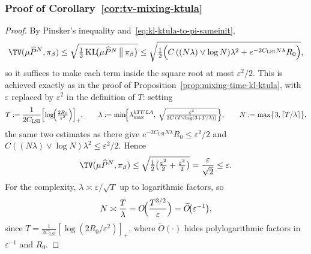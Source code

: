 \documentclass[11pt,a4paper,reqno]{amsart}
\theoremstyle{plain}
\theoremstyle{definition}
\theoremstyle{remark}
\newcommand{\KL}{\mathrm{KL}}
\begin{document}
\subsubsection{Proof of Corollary~\ref{cor:tv-mixing-ktula}}
\label{proof:tv-ktula}
\begin{proof}
By Pinsker's inequality and~\eqref{eq:kl-ktula-to-pi-sameinit},
\[
  \TV(\mu\widehat P^{N},\pi_\beta)
  \le
  \sqrt{\tfrac12\,\KL\!\bigl(\mu\widehat P^{N}\,\big\|\,\pi_\beta\bigr)}
  \le
  \sqrt{\tfrac12\Bigl(C\,((N\lambda)\vee \log N)\lambda^2 + e^{-2C_{\mathrm{LSI}}N\lambda}R_0\Bigr)},
\]
so it suffices to make each term inside the square root at most $\varepsilon^2/2$. This is achieved exactly as in the proof of Proposition~\ref{prop:mixing-time-kl-ktula}, with $\varepsilon$ replaced by $\varepsilon^2$ in the definition of $T$: setting
\[
  T:=\frac{1}{2C_{\mathrm{LSI}}}\Bigl[\log\!\Bigl(\tfrac{2R_0}{\varepsilon^2}\Bigr)\Bigr]_+,
  \qquad
  \lambda:=\min\!\Bigl\{\lambda_{\max}^{kTULA},\;
  \sqrt{\tfrac{\varepsilon^2}{2C\,(T\vee \log(3+T/\lambda))}}\Bigr\},
  \qquad
  N:=\max\bigl\{3,\lceil T/\lambda\rceil\bigr\},
\]
the same two estimates as there give $e^{-2C_{\mathrm{LSI}}N\lambda}R_0\le\varepsilon^2/2$ and $C((N\lambda)\vee\log N)\lambda^2\le\varepsilon^2/2$. Hence
\[
  \TV(\mu\widehat P^{N},\pi_\beta)
  \le
  \sqrt{\tfrac12\bigl(\tfrac{\varepsilon^2}{2}+\tfrac{\varepsilon^2}{2}\bigr)}
  =
  \frac{\varepsilon}{\sqrt2}
  \le \varepsilon.
\]
For the complexity, $\lambda\asymp\varepsilon/\sqrt{T}$ up to logarithmic factors, so
\[
  N\asymp \frac{T}{\lambda}
  =
  O\!\Bigl(\frac{T^{3/2}}{\varepsilon}\Bigr)
  =
  \widetilde O\!\bigl(\varepsilon^{-1}\bigr),
\]
since $T=\tfrac{1}{2C_{\mathrm{LSI}}}[\log(2R_0/\varepsilon^2)]_+$, where $\widetilde O(\cdot)$ hides polylogarithmic factors in $\varepsilon^{-1}$ and $R_0$.
\end{proof}
\end{document}
